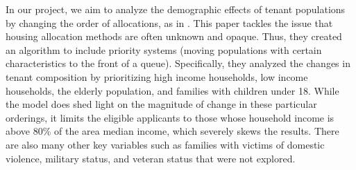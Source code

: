 \documentclass[11pt]{article}
\begin{document}
\newline

In our project, we aim to analyze the demographic effects of tenant populations by changing the order of allocations, as in \cite{nyuaffordablehousing}. This paper tackles the issue that housing allocation methods are often unknown and opaque. Thus, they created an algorithm to include priority systems (moving populations with certain characteristics to the front of a queue). Specifically, they analyzed the changes in tenant composition by prioritizing high income households, low income households, the elderly population, and families with children under 18. While the model does shed light on the magnitude of change in these particular orderings, it limits the eligible applicants to those whose household income is above 80\% of the area median income, which severely skews the results. There are also many other key variables such as families with victims of domestic violence, military status, and veteran status that were not explored.\\
\end{document}
